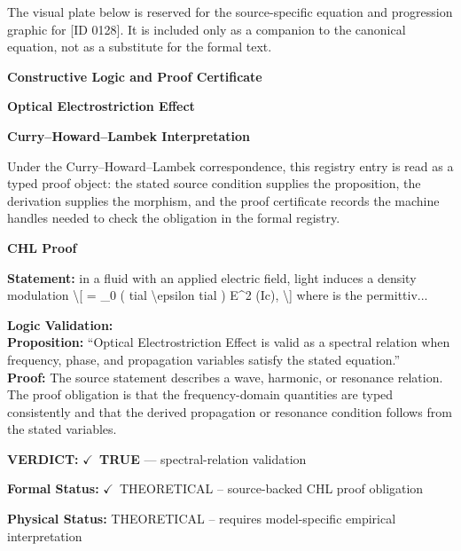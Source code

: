 \begingroup\footnotesize\sloppy
The visual plate below is reserved for the source-specific equation and progression graphic for [ID 0128]. It is included only as a companion to the canonical equation, not as a substitute for the formal text.
\par\endgroup
\ifTZPDarkEdition
{}
\fi

\clearpage
\begingroup\tzpsupportsetup
\noindent\textbf{\fontsize{10.8pt}{12.8pt}\selectfont [ID 0128] Constructive Logic and Proof Certificate}\par
\noindent\textbf{\fontsize{10pt}{12pt}\selectfont Optical Electrostriction Effect}\par
\vspace{0.45em}
\begingroup
\footnotesize
\setlength{\parskip}{0.22em}
\setlength{\parindent}{0pt}
\noindent\textbf{Curry--Howard--Lambek Interpretation}\par
Under the Curry--Howard--Lambek correspondence, this registry entry is read as a typed proof
object: the stated source condition supplies the proposition, the derivation supplies the
morphism, and the proof certificate records the machine handles needed to check the obligation
in the formal registry.

\vspace{0.45em}
\noindent\textbf{CHL Proof}\par
\textbf{Statement:} in a fluid with an applied electric field, light induces a density modulation \textbackslash{}[ = \_0 (
tial \textbackslash{}epsilon tial ) E\textasciicircum{}2 (Ic), \textbackslash{}] where  is the permittiv...

\textbf{Logic Validation:}\\
\textbf{Proposition:} ``Optical Electrostriction Effect is valid as a spectral relation when frequency, phase,
and propagation variables satisfy the stated equation.''\\
\textbf{Proof:} The source statement describes a wave, harmonic, or resonance relation. The proof
obligation is that the frequency-domain quantities are typed consistently and that the
derived propagation or resonance condition follows from the stated variables.

\textbf{VERDICT:} \ensuremath{\checkmark}\ \textbf{TRUE} --- spectral-relation validation

\textbf{Formal Status:} \ensuremath{\checkmark}\ THEORETICAL -- source-backed CHL proof obligation

\textbf{Physical Status:} THEORETICAL -- requires model-specific empirical interpretation
\par\vspace{0.45em}
\par
\ifTZPDarkEdition
{}
\fi
\endgroup
\endgroup
